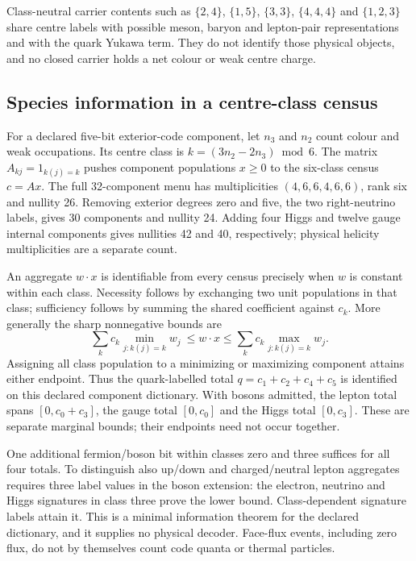 Class-neutral carrier contents such as $\{2,4\}$, $\{1,5\}$, $\{3,3\}$, $\{4,4,4\}$ and
$\{1,2,3\}$ share centre labels with possible meson, baryon and lepton-pair
representations and with the quark Yukawa term. They do not identify those physical
objects, and no closed carrier holds a net colour or weak centre charge.

\subsection{Species information in a centre-class census}
\label{sec:species-identifiability}

For a declared five-bit exterior-code component, let $n_3$ and $n_2$
count colour and weak occupations. Its centre class is
$k=(3n_2-2n_3)\bmod6$. The matrix $A_{kj}=1_{k(j)=k}$ pushes component
populations $x\ge0$ to the six-class census $c=Ax$. The full 32-component
menu has multiplicities $(4,6,6,4,6,6)$, rank six and nullity 26.
Removing exterior degrees zero and five, the two right-neutrino labels,
gives 30 components and nullity 24. Adding four Higgs and twelve gauge
internal components gives nullities 42 and 40, respectively; physical
helicity multiplicities are a separate count.

An aggregate $w\cdot x$ is identifiable from every census precisely when
$w$ is constant within each class. Necessity follows by exchanging two unit
populations in that class; sufficiency follows by summing the shared
coefficient against $c_k$. More generally the sharp nonnegative bounds are
\[
 \sum_k c_k\min_{j:k(j)=k}w_j\ \le w\cdot x\le
 \sum_k c_k\max_{j:k(j)=k}w_j.
\]
Assigning all class population to a minimizing or maximizing component
attains either endpoint. Thus the quark-labelled total
$q=c_1+c_2+c_4+c_5$ is identified on this declared component dictionary.
With bosons admitted, the lepton total spans $[0,c_0+c_3]$, the gauge
total $[0,c_0]$ and the Higgs total $[0,c_3]$. These are separate marginal
bounds; their endpoints need not occur together.

One additional fermion/boson bit within classes zero and three suffices
for all four totals. To distinguish also up/down and charged/neutral
lepton aggregates requires three label values in the boson extension:
the electron, neutrino and Higgs signatures in class three prove the lower
bound. Class-dependent signature labels attain it. This is a minimal
information theorem for the declared dictionary, and it supplies no physical decoder.
Face-flux events, including zero flux, do not by themselves count
code quanta or thermal particles.

